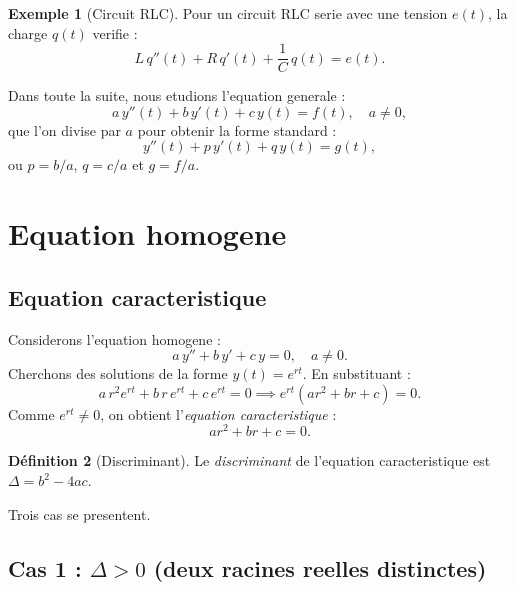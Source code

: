 \documentclass[12pt,a4paper,openany]{book}
\theoremstyle{definition}
\newtheorem{definition}{Définition}[chapter]
\newtheorem{exemple}[definition]{Exemple}
\theoremstyle{plain}
\theoremstyle{remark}
\begin{document}
\begin{exemple}[Circuit RLC]\label{ex:rlc}
Pour un circuit RLC serie avec une tension $e(t)$, la charge $q(t)$ verifie :
\[
  L\, q''(t) + R\, q'(t) + \frac{1}{C}\, q(t) = e(t).
\]
\end{exemple}

Dans toute la suite, nous etudions l'equation generale :
\begin{equation}\label{eq:edl2-generale}
  a\, y''(t) + b\, y'(t) + c\, y(t) = f(t), \quad a \neq 0,
\end{equation}
que l'on divise par $a$ pour obtenir la forme standard :
\begin{equation}\label{eq:edl2-standard}
  y''(t) + p\, y'(t) + q\, y(t) = g(t),
\end{equation}
ou $p = b/a$, $q = c/a$ et $g = f/a$.

\section{Equation homogene}\label{sec:edl2-homogene}

\subsection{Equation caracteristique}\label{subsec:eq-caract}

Considerons l'equation homogene :
\begin{equation}\label{eq:edl2-homogene}
  a\, y'' + b\, y' + c\, y = 0, \quad a \neq 0.
\end{equation}
Cherchons des solutions de la forme $y(t) = e^{rt}$. En substituant :
\[
  a\, r^2 e^{rt} + b\, r\, e^{rt} + c\, e^{rt} = 0 \implies e^{rt}(ar^2 + br + c) = 0.
\]
Comme $e^{rt} \neq 0$, on obtient l'\emph{equation caracteristique} :
\begin{equation}\label{eq:caract}
  ar^2 + br + c = 0.
\end{equation}

\begin{definition}[Discriminant]\label{def:discriminant}
Le \emph{discriminant} de l'equation caracteristique est $\Delta = b^2 - 4ac$.
\end{definition}

Trois cas se presentent.

\subsection{Cas 1 : $\Delta > 0$ (deux racines reelles distinctes)}\label{subsec:delta-positif}
\end{document}
